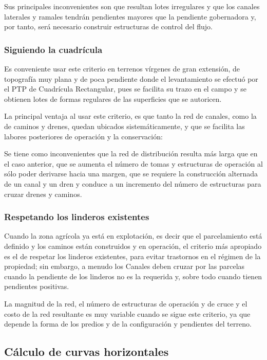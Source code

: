 Sus principales inconvenientes son que resultan lotes irregulares y que los canales laterales y ramales tendrán pendientes mayores que la pendiente gobernadora y, por tanto, será necesario construir estructuras de control del flujo.

\subsubsection{Siguiendo la cuadrícula}

Es conveniente usar este criterio en terrenos vírgenes de gran extensión, de topografía muy plana y de poca pendiente donde el levantamiento se efectuó por el PTP de Cuadrícula Rectangular, pues se facilita su trazo en el campo y se obtienen lotes de formas regulares de las superficies que se autoricen.

La principal ventaja al usar este criterio, es que tanto la red de canales, como la de caminos y drenes, quedan ubicados sistemáticamente, y que se facilita las labores posteriores de operación y la conservación:

Se tiene como inconvenientes que la red de distribución resulta más larga que en el caso anterior, que se aumenta el número de tomas y estructuras de operación al sólo poder derivarse hacia una margen, que se requiere la construcción alternada de un canal y un dren y conduce a un incremento del número de estructuras para cruzar drenes y caminos.
\subsubsection{Respetando los linderos existentes}
Cuando la zona agrícola ya está en explotación, es decir que el parcelamiento está definido y los caminos están construidos y en operación, el criterio más apropiado es el de respetar los linderos existentes, para evitar trastornos en el régimen de la propiedad; sin embargo, a menudo los Canales deben cruzar por las parcelas cuando la pendiente de los linderos no es la requerida y, sobre todo cuando tienen pendientes positivas.

La magnitud de la red, el número de estructuras de operación y de cruce y el costo de la red resultante es muy variable cuando se sigue este criterio, ya que depende la forma de los predios y de la configuración y pendientes del terreno.

\subsection{Cálculo de curvas horizontales}

